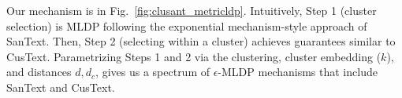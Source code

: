 Our mechanism is in Fig.~\ref{fig:clusant_metricldp}. Intuitively, Step 1  (cluster selection) is MLDP following the exponential mechanism-style approach of SanText. Then, Step 2 (selecting within a cluster) achieves guarantees similar to CusText. Parametrizing Steps 1 and 2 via the clustering, cluster embedding ($k$), and distances $d, d_c$, gives us a spectrum of $\epsilon$-MLDP mechanisms that include SanText and CusText. 
%


